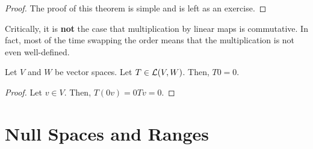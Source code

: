 \begin{proof}
    The proof of this theorem is simple and is left as an exercise.
\end{proof}
Critically, it is \textbf{not} the case that multiplication by linear maps is commutative. In fact, most of the time swapping the order means that the multiplication is not even well-defined.
\begin{theorem}
    Let $V$ and $W$ be vector spaces. Let $T\in\mathcal{L}(V,W)$. Then, $T0=0$.
\end{theorem}
\begin{proof}
    Let $v\in V$. Then, $T(0v) = 0Tv = 0$.
\end{proof}
\section{Null Spaces and Ranges}

